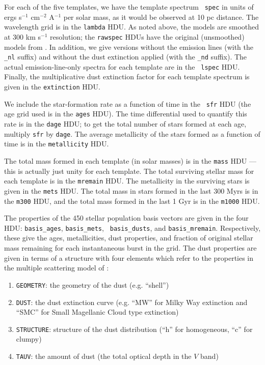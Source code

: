 \documentclass[10pt,preprint]{aastex}
\renewcommand{\AA}{A}
\begin{document}
For each of the five templates, we have the template spectrum {\tt
spec} in units of ergs s$^{-1}$ cm$^{-2}$ \AA$^{-1}$ per solar mass,
as it would be observed at 10 pc distance. The wavelength grid is in
the {\tt lambda} HDU. As noted above, the models are smoothed at 300
km s$^{-1}$ resolution; the {\tt rawspec} HDUs have the original
(unsmoothed) models from \citet{bruzual03a}. In addition, we give
versions without the emission lines (with the {\tt \_nl} suffix) and
without the dust extinction applied (with the {\tt \_nd} suffix). The
actual emission-line-only spectra for each template are in the {\tt
lspec} HDU. Finally, the multiplicative dust extinction factor for
each template spectrum is given in the {\tt extinction} HDU.

We include the star-formation rate as a function of time in the {\tt
sfr} HDU (the age grid used is in the {\tt ages} HDU). The time
differential used to quantify this rate is in the {\tt dage} HDU; to
get the total number of stars formed at each age, multiply {\tt sfr}
by {\tt dage}. The average metallicity of the stars formed as a
function of time is in the {\tt metallicity} HDU.

The total mass formed in each template (in solar masses) is in the
{\tt mass} HDU --- this is actually just unity for each template. The
total surviving stellar mass for each template is in the {\tt mremain}
HDU. The metallicity in the surviving stars is given in the {\tt mets}
HDU.  The total mass in stars formed in the last 300 Myrs is in the
{\tt m300} HDU, and the total mass formed in the last 1 Gyr is in the
{\tt m1000} HDU.

The properties of the 450 stellar population basis vectors are given
in the four HDU: {\tt basis\_ages}, {\tt basis\_mets}, {\tt
basis\_dusts}, and {\tt basis\_mremain}. Respectively, these give the
ages, metallicities, dust properties, and fraction of original stellar
mass remaining for each instantaneous burst in the grid. The dust 
properties are given in terms of a structure with four elements which
refer to the properties in the multiple scattering model of \citet{witt00a}:
\begin{enumerate}
\item {\tt GEOMETRY}: the geometry of the dust (e.g. ``shell'') 
\item {\tt DUST}: the dust extinction curve (e.g. ``MW'' for Milky
	Way extinction and ``SMC'' for Small Magellanic Cloud type
	extinction) 
\item {\tt STRUCTURE}: structure of the dust distribution (``h'' for
	homogeneous, ``c'' for clumpy)
\item {\tt TAUV}: the amount of dust (the total optical depth in the
	$V$ band)
\end{enumerate}
\end{document}
